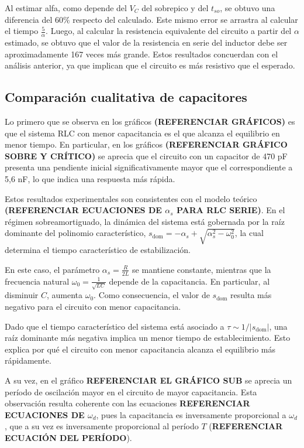 Al estimar alfa, como depende del $V_C$ del sobrepico y del $t_{so}$, se obtuvo una diferencia del $60\%$ respecto del calculado. Este mismo error se arrastra al calcular el tiempo $\frac{5}{\alpha}$. Luego, al calcular la resistencia equivalente del circuito a partir del $\alpha$ estimado, se obtuvo que el valor de la resistencia en serie del inductor debe ser aproximadamente 167 veces más grande. Estos resultados concuerdan con el análisis anterior, ya que implican que el circuito es más resistivo que el esperado.

\subsection{Comparación cualitativa de capacitores}

Lo primero que se observa en los gráficos \textbf{(REFERENCIAR GRÁFICOS)} es que el sistema RLC con menor capacitancia es el que alcanza el equilibrio en menor tiempo. En particular, en los gráficos \textbf{(REFERENCIAR GRÁFICO SOBRE Y CRÍTICO)} se aprecia que el circuito con un capacitor de 470 pF presenta una pendiente inicial significativamente mayor que el correspondiente a 5,6 nF, lo que indica una respuesta más rápida.

Estos resultados experimentales son consistentes con el modelo teórico \textbf{(REFERENCIAR ECUACIONES DE $\alpha_s$ PARA RLC SERIE)}. En el régimen sobreamortiguado, la dinámica del sistema está gobernada por la raíz dominante del polinomio característico, $s_{\text{dom}} = -\alpha_s + \sqrt{\alpha_s^2 - \omega_0^2}$, la cual determina el tiempo característico de estabilización.

En este caso, el parámetro $\alpha_s = \frac{R}{2L}$ se mantiene constante, mientras que la frecuencia natural $\omega_0 = \frac{1}{\sqrt{LC}}$ depende de la capacitancia. En particular, al disminuir $C$, aumenta $\omega_0$. Como consecuencia, el valor de $s_{\text{dom}}$ resulta más negativo para el circuito con menor capacitancia.

Dado que el tiempo característico del sistema está asociado a $\tau \sim 1/|s_{\text{dom}}|$, una raíz dominante más negativa implica un menor tiempo de establecimiento. Esto explica por qué el circuito con menor capacitancia alcanza el equilibrio más rápidamente.

A su vez, en el gráfico \textbf{REFERENCIAR EL GRÁFICO SUB} se aprecia un período de oscilación mayor en el circuito de mayor capacitancia. Esta observación resulta coherente con las ecuaciones \textbf{REFERENCIAR ECUACIONES DE $\omega_d$}, pues la capacitancia es inversamente proporcional a $\omega_d$, que a su vez es inversamente proporcional al período $T$ (\textbf{REFERENCIAR ECUACIÓN DEL PERÍODO}).

